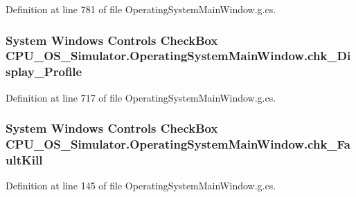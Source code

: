 Definition at line 781 of file Operating\+System\+Main\+Window.\+g.\+cs.

\hypertarget{class_c_p_u___o_s___simulator_1_1_operating_system_main_window_aa13338d96952aafec3ecbc7f4fa6fcfc}{}
\subsubsection[{chk\+\_\+\+Display\+\_\+\+Profile}]{\setlength{\rightskip}{0pt plus 5cm}System Windows Controls Check\+Box C\+P\+U\+\_\+\+O\+S\+\_\+\+Simulator.\+Operating\+System\+Main\+Window.\+chk\+\_\+\+Display\+\_\+\+Profile\hspace{0.3cm}{\ttfamily [package]}}\label{class_c_p_u___o_s___simulator_1_1_operating_system_main_window_aa13338d96952aafec3ecbc7f4fa6fcfc}


Definition at line 717 of file Operating\+System\+Main\+Window.\+g.\+cs.

\hypertarget{class_c_p_u___o_s___simulator_1_1_operating_system_main_window_ad8b3845bf83d04c87c660d142f021e83}{}
\subsubsection[{chk\+\_\+\+Fault\+Kill}]{\setlength{\rightskip}{0pt plus 5cm}System Windows Controls Check\+Box C\+P\+U\+\_\+\+O\+S\+\_\+\+Simulator.\+Operating\+System\+Main\+Window.\+chk\+\_\+\+Fault\+Kill\hspace{0.3cm}{\ttfamily [package]}}\label{class_c_p_u___o_s___simulator_1_1_operating_system_main_window_ad8b3845bf83d04c87c660d142f021e83}


Definition at line 145 of file Operating\+System\+Main\+Window.\+g.\+cs.


